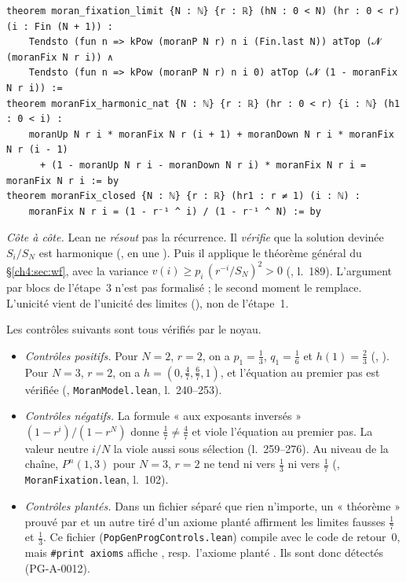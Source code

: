 \begin{leanbox}
\begin{lstlisting}[language=Lean]
theorem moran_fixation_limit {N : ℕ} {r : ℝ} (hN : 0 < N) (hr : 0 < r) (i : Fin (N + 1)) :
    Tendsto (fun n => kPow (moranP N r) n i (Fin.last N)) atTop (𝓝 (moranFix N r i)) ∧
    Tendsto (fun n => kPow (moranP N r) n i 0) atTop (𝓝 (1 - moranFix N r i)) :=
theorem moranFix_harmonic_nat {N : ℕ} {r : ℝ} (hr : 0 < r) {i : ℕ} (h1 : 0 < i) :
    moranUp N r i * moranFix N r (i + 1) + moranDown N r i * moranFix N r (i - 1)
      + (1 - moranUp N r i - moranDown N r i) * moranFix N r i = moranFix N r i := by
theorem moranFix_closed {N : ℕ} {r : ℝ} (hr1 : r ≠ 1) (i : ℕ) :
    moranFix N r i = (1 - r⁻¹ ^ i) / (1 - r⁻¹ ^ N) := by
\end{lstlisting}
\emph{Côte à côte.} Lean ne \emph{résout} pas la récurrence. Il \emph{vérifie} que la solution devinée
$S_i/S_N$ est harmonique (, en une ). Puis il applique le
théorème général  du §\ref{ch4:sec:wf}, avec la variance
$v(i)\ge p_i\,(r^{-i}/S_N)^2>0$ (, l.~189). L'argument par blocs de l'étape~3 n'est pas
formalisé ; le second moment le remplace. L'unicité vient de l'unicité des limites
(), non de l'étape~1.
\end{leanbox}

\begin{remark}\label{ch4:rem:moranctl}
Les contrôles suivants sont tous vérifiés par le noyau.
\begin{itemize}[itemsep=1pt]
\item \emph{Contrôles positifs.} Pour $N=2$, $r=2$, on a $p_1=\frac13$, $q_1=\frac16$ et $h(1)=\frac23$
(, ). Pour $N=3$, $r=2$, on a $h=(0,\frac47,\frac67,1)$, et
l'équation au premier pas est vérifiée (, \texttt{MoranModel.lean}, l.~240--253).
\item \emph{Contrôles négatifs.} La formule « aux exposants inversés » $(1-r^i)/(1-r^N)$ donne $\frac17\ne\frac47$
et viole l'équation au premier pas. La valeur neutre $i/N$ la viole aussi sous sélection (l.~259--276). Au niveau
de la chaîne, $P^n(1,3)$ pour $N=3$, $r=2$ ne tend ni vers $\frac13$ ni vers $\frac17$
(, \texttt{MoranFixation.lean}, l.~102).
\item \emph{Contrôles plantés.} Dans un fichier séparé que rien n'importe, un « théorème » prouvé par 
et un autre tiré d'un axiome planté affirment les limites fausses $\frac17$ et $\frac13$. Ce fichier
(\texttt{PopGenProgControls.lean}) compile avec le code de retour~$0$, mais \texttt{\#print axioms} affiche , resp.\ l'axiome planté
. Ils sont donc détectés (PG-A-0012).
\end{itemize}
\end{remark}

